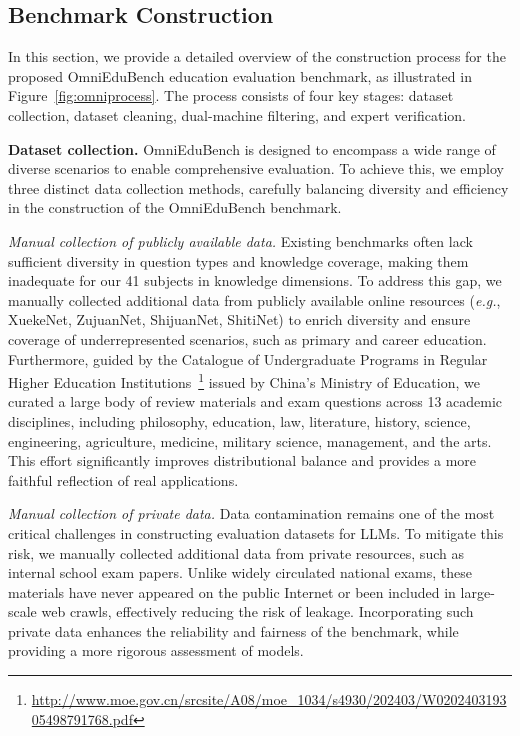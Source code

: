 \subsection{Benchmark Construction}
\label{subsec:bc}

In this section, we provide a detailed overview of the construction process for the proposed OmniEduBench education evaluation benchmark, as illustrated in Figure~\ref{fig:omniprocess}. The process consists of four key stages: dataset collection, dataset cleaning, dual-machine filtering, and expert verification.

\textbf{Dataset collection.} OmniEduBench is designed to encompass a wide range of diverse scenarios to enable comprehensive evaluation. To achieve this, we employ three distinct data collection methods, carefully balancing diversity and efficiency in the construction of the OmniEduBench benchmark.

\textit{Manual collection of publicly available data.} 
Existing benchmarks often lack sufficient diversity in question types and knowledge coverage, making them inadequate for our 41 subjects in knowledge dimensions. To address this gap, we manually collected additional data from publicly available online resources (\textit{e.g.}, XuekeNet, ZujuanNet, ShijuanNet, ShitiNet) to enrich diversity and ensure coverage of underrepresented scenarios, such as primary and career education. Furthermore, guided by the Catalogue of Undergraduate Programs in Regular Higher Education Institutions~\footnote{\url{http://www.moe.gov.cn/srcsite/A08/moe_1034/s4930/202403/W020240319305498791768.pdf}} issued by China’s Ministry of Education, we curated a large body of review materials and exam questions across 13 academic disciplines, including philosophy, education, law, literature, history, science, engineering, agriculture, medicine, military science, management, and the arts. This effort significantly improves distributional balance and provides a more faithful reflection of real applications.

\textit{Manual collection of private data.}
Data contamination remains one of the most critical challenges in constructing evaluation datasets for LLMs. To mitigate this risk, we manually collected additional data from private resources, such as internal school exam papers. Unlike widely circulated national exams, these materials have never appeared on the public Internet or been included in large-scale web crawls, effectively reducing the risk of leakage. Incorporating such private data enhances the reliability and fairness of the benchmark, while providing a more rigorous assessment of models.

